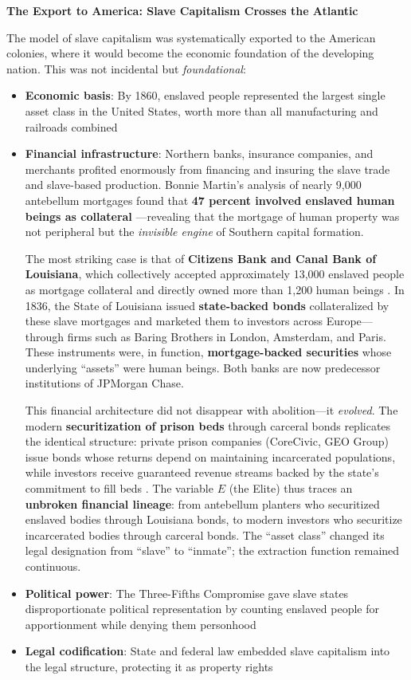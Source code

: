 \documentclass[12pt,openany]{book}
\begin{document}
\textbf{The Export to America: Slave Capitalism Crosses the Atlantic}

The model of slave capitalism was systematically exported to the American colonies, where it would become the economic foundation of the developing nation. This was not incidental but \textit{foundational}:

\begin{itemize}
    \item \textbf{Economic basis}: By 1860, enslaved people represented the largest single asset class in the United States, worth more than all manufacturing and railroads combined \cite{baptist, beckert}
    \item \textbf{Financial infrastructure}: Northern banks, insurance companies, and merchants profited enormously from financing and insuring the slave trade and slave-based production. Bonnie Martin's analysis of nearly 9,000 antebellum mortgages found that \textbf{47 percent involved enslaved human beings as collateral} \cite{martin}---revealing that the mortgage of human property was not peripheral but the \textit{invisible engine} of Southern capital formation.

    The most striking case is that of \textbf{Citizens Bank and Canal Bank of Louisiana}, which collectively accepted approximately 13,000 enslaved people as mortgage collateral and directly owned more than 1,200 human beings \cite{baptist, murphy}. In 1836, the State of Louisiana issued \textbf{state-backed bonds} collateralized by these slave mortgages and marketed them to investors across Europe---through firms such as Baring Brothers in London, Amsterdam, and Paris. These instruments were, in function, \textbf{mortgage-backed securities} whose underlying ``assets'' were human beings. Both banks are now predecessor institutions of JPMorgan Chase.

    This financial architecture did not disappear with abolition---it \textit{evolved}. The modern \textbf{securitization of prison beds} through carceral bonds replicates the identical structure: private prison companies (CoreCivic, GEO Group) issue bonds whose returns depend on maintaining incarcerated populations, while investors receive guaranteed revenue streams backed by the state's commitment to fill beds \cite{alexander}. The variable $E$ (the Elite) thus traces an \textbf{unbroken financial lineage}: from antebellum planters who securitized enslaved bodies through Louisiana bonds, to modern investors who securitize incarcerated bodies through carceral bonds. The ``asset class'' changed its legal designation from ``slave'' to ``inmate''; the extraction function remained continuous.
    \item \textbf{Political power}: The Three-Fifths Compromise gave slave states disproportionate political representation by counting enslaved people for apportionment while denying them personhood
    \item \textbf{Legal codification}: State and federal law embedded slave capitalism into the legal structure, protecting it as property rights
\end{itemize}
\end{document}
